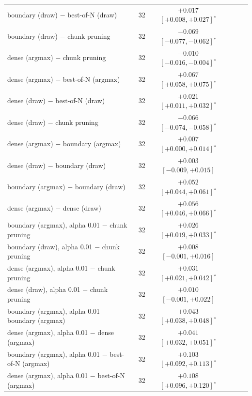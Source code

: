 \begin{tabular}{llcccc}
boundary (draw) $-$ best-of-N (draw) & 32 & $+0.017$ $[+0.008, +0.027]$$^*$ & & & \\
boundary (draw) $-$ chunk pruning & 32 & $-0.069$ $[-0.077, -0.062]$$^*$ & & & \\
dense (argmax) $-$ chunk pruning & 32 & $-0.010$ $[-0.016, -0.004]$$^*$ & & & \\
dense (argmax) $-$ best-of-N (argmax) & 32 & $+0.067$ $[+0.058, +0.075]$$^*$ & & & \\
dense (draw) $-$ best-of-N (draw) & 32 & $+0.021$ $[+0.011, +0.032]$$^*$ & & & \\
dense (draw) $-$ chunk pruning & 32 & $-0.066$ $[-0.074, -0.058]$$^*$ & & & \\
dense (argmax) $-$ boundary (argmax) & 32 & $+0.007$ $[+0.000, +0.014]$$^*$ & & & \\
dense (draw) $-$ boundary (draw) & 32 & $+0.003$ $[-0.009, +0.015]$ & & & \\
boundary (argmax) $-$ boundary (draw) & 32 & $+0.052$ $[+0.044, +0.061]$$^*$ & & & \\
dense (argmax) $-$ dense (draw) & 32 & $+0.056$ $[+0.046, +0.066]$$^*$ & & & \\
boundary (argmax), alpha 0.01 $-$ chunk pruning & 32 & $+0.026$ $[+0.019, +0.033]$$^*$ & & & \\
boundary (draw), alpha 0.01 $-$ chunk pruning & 32 & $+0.008$ $[-0.001, +0.016]$ & & & \\
dense (argmax), alpha 0.01 $-$ chunk pruning & 32 & $+0.031$ $[+0.021, +0.042]$$^*$ & & & \\
dense (draw), alpha 0.01 $-$ chunk pruning & 32 & $+0.010$ $[-0.001, +0.022]$ & & & \\
boundary (argmax), alpha 0.01 $-$ boundary (argmax) & 32 & $+0.043$ $[+0.038, +0.048]$$^*$ & & & \\
dense (argmax), alpha 0.01 $-$ dense (argmax) & 32 & $+0.041$ $[+0.032, +0.051]$$^*$ & & & \\
boundary (argmax), alpha 0.01 $-$ best-of-N (argmax) & 32 & $+0.103$ $[+0.092, +0.113]$$^*$ & & & \\
dense (argmax), alpha 0.01 $-$ best-of-N (argmax) & 32 & $+0.108$ $[+0.096, +0.120]$$^*$ & & & \\
\bottomrule
\end{tabular}

